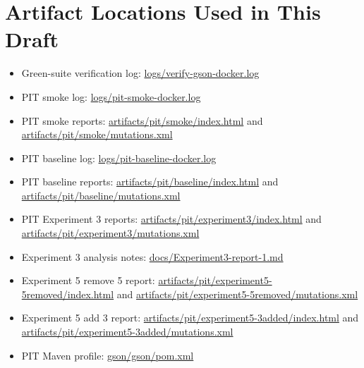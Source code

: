\documentclass[11pt]{article}
\begin{document}
\section{Artifact Locations Used in This Draft}
\begin{itemize}
  \item Green-suite verification log: \url{logs/verify-gson-docker.log}
  \item PIT smoke log: \url{logs/pit-smoke-docker.log}
  \item PIT smoke reports: \url{artifacts/pit/smoke/index.html} and \url{artifacts/pit/smoke/mutations.xml}
  \item PIT baseline log: \url{logs/pit-baseline-docker.log}
  \item PIT baseline reports: \url{artifacts/pit/baseline/index.html} and \url{artifacts/pit/baseline/mutations.xml}
  \item PIT Experiment 3 reports: \url{artifacts/pit/experiment3/index.html} and \url{artifacts/pit/experiment3/mutations.xml}
  \item Experiment 3 analysis notes: \url{docs/Experiment3-report-1.md}
  \item Experiment 5 remove 5 report: \url{artifacts/pit/experiment5-5removed/index.html} and \url{artifacts/pit/experiment5-5removed/mutations.xml}
  \item Experiment 5 add 3 report: \url{artifacts/pit/experiment5-3added/index.html} and \url{artifacts/pit/experiment5-3added/mutations.xml}
  \item PIT Maven profile: \url{gson/gson/pom.xml}
\end{itemize}
\end{document}

